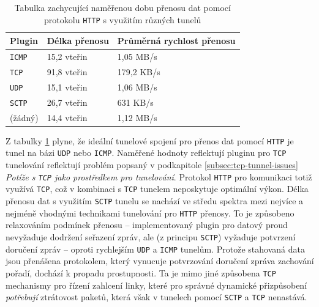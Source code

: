 \documentclass[thesis=M,czech]{FITthesis}[2012/10/20]
\begin{document}
    \begin{table}[h]
	\centering
	\begin{tabular}{|l||l|l|}
	\hline
	Plugin  & Délka přenosu & Průměrná rychlost přenosu \\ \hline \hline
	\texttt{ICMP}    & 15,2 vteřin   & 1,05 MB/s                 \\ \hline
	\texttt{TCP}     & 91,8 vteřin   & 179,2 KB/s                \\ \hline
	\texttt{UDP}     & 15,1 vteřin   & 1,06 MB/s                 \\ \hline
	\texttt{SCTP}    & 26,7 vteřin   & 631 KB/s                  \\ \hline
	(žádný) & 14,4 vteřin   & 1,12 MB/s                 \\ \hline
	\end{tabular}
	\caption{Tabulka zachycující naměřenou dobu přenosu dat pomocí protokolu \texttt{HTTP} s využitím různých tunelů}
	\label{tab:http-download}
    \end{table}
       
       
       Z tabulky \ref{tab:http-download} plyne, že ideální tunelové spojení pro přenos dat pomocí \texttt{HTTP} je tunel na bázi \texttt{UDP} nebo \texttt{ICMP}. Naměřené hodnoty reflektují pluginu pro \texttt{TCP} tunelování reflektují problém popsaný v podkapitole \ref{subsec:tcp-tunnel-issues} \textit{Potíže s \texttt{TCP} jako prostředkem pro tunelování}. Protokol \texttt{HTTP} pro komunikaci totiž využívá \texttt{TCP}, což v kombinaci s \texttt{TCP} tunelem neposkytuje optimální výkon. Délka přenosu dat s využitím \texttt{SCTP} tunelu se nachází ve středu spektra mezi nejvíce a nejméně vhodnými technikami tunelování pro \texttt{HTTP} přenosy. To je způsobeno relaxováním podmínek přenosu -- implementovaný plugin pro datový proud nevyžaduje dodržení seřazení zpráv, ale (z principu \texttt{SCTP}) vyžaduje potvrzení doručení zpráv -- oproti rychlejším \texttt{UDP} a \texttt{ICMP} tunelům. Protože stahovaná data jsou přenášena protokolem, který vynucuje potvrzování doručení zpráva zachování pořadí, dochází k propadu prostupnosti. Ta je mimo jiné způsobena \texttt{TCP} mechanismy pro řízení zahlcení linky, které pro správné dynamické přizpůsobení \textit{potřebují} ztrátovost paketů, která však v tunelech pomocí \texttt{SCTP} a \texttt{TCP} nenastává.
       
    
\end{document}
